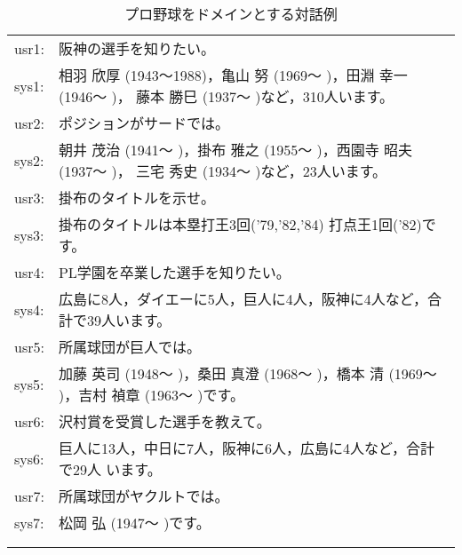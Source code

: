 \begin{table}[thp]
\caption{プロ野球をドメインとする対話例}\label{tab:baseball}
\bigskip \centering \tt

\begin{tabular}{lp{120mm}} \hline\hline
usr1:&阪神の選手を知りたい。\rule{0pt}{12pt}\\
sys1:&相羽 欣厚 (1943〜1988)，亀山 努 (1969〜  )，田淵 幸一 (1946〜  )，
藤本 勝巳 (1937〜  )など，310人います。\\
usr2:&ポジションがサードでは。\\
sys2:&朝井 茂治 (1941〜  )，掛布 雅之 (1955〜  )，西園寺 昭夫 (1937〜 )，
三宅 秀史 (1934〜  )など，23人います。\\
usr3:&掛布のタイトルを示せ。\\
sys3:&掛布のタイトルは本塁打王3回('79,'82,'84) 打点王1回('82)です。\\
usr4:&PL学園を卒業した選手を知りたい。\\
sys4:&広島に8人，ダイエーに5人，巨人に4人，阪神に4人など，合計で39人います。\\
usr5:&所属球団が巨人では。\\
sys5:&加藤 英司 (1948〜  )，桑田 真澄 (1968〜  )，橋本 清 (1969〜  )，吉村 禎章 (1963〜  )です。\\
usr6:&沢村賞を受賞した選手を教えて。\\
sys6:&巨人に13人，中日に7人，阪神に6人，広島に4人など，合計で29人
\footnotemark います。\\
usr7:&所属球団がヤクルトでは。\\
sys7:&松岡 弘 (1947〜  )です。
\\ \hline\hline
\\
\addtocounter{footnote}{-1}
& \footnotemark {\footnotesize 移籍した選手は所属したすべての球団で
カウントしているため，球団別の``のべ人数''より少ない．}
\end{tabular}
\end{table}
